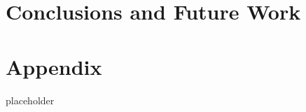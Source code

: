 \documentclass{uiophd}
\begin{document}
\chapter{Conclusions and Future Work}
\label{chap:future work}




\appendix
\chapter{Appendix}
placeholder
\newpage
{}


\end{document}
